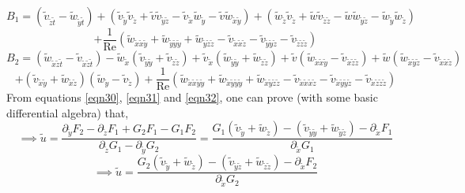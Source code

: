 \documentclass{article}
\begin{document}
\begin{equation*}
B_1 =  (\tilde{v}_{\tilde{z}\tilde{t}}-\tilde{w}_{\tilde{y}\tilde{t}})+(\tilde{v}_{\tilde{y}} \tilde{v}_{\tilde{z}} + \tilde{v} \tilde{v}_{\tilde{y}\tilde{z}} - \tilde{v}_{\tilde{x}} \tilde{w}_{\tilde{y}} - \tilde{v} \tilde{w}_{\tilde{x}\tilde{y}}) + (\tilde{w}_{\tilde{z}} \tilde{v}_{\tilde{z}} + \tilde{w} \tilde{v}_{\tilde{z}\tilde{z}} - \tilde{w} \tilde{w}_{\tilde{y}\tilde{z}} - \tilde{w}_{\tilde{y}} \tilde{w}_{\tilde{z}})
\end{equation*}
\begin{equation}
 + \frac{1}{\operatorname{Re}} (\tilde{w}_{\tilde{x}\tilde{x}\tilde{y}}+\tilde{w}_{\tilde{y}\tilde{y}\tilde{y}}+\tilde{w}_{\tilde{y}\tilde{z}\tilde{z}}-\tilde{v}_{\tilde{x}\tilde{x}\tilde{z}}-\tilde{v}_{\tilde{y}\tilde{y}\tilde{z}}-\tilde{v}_{\tilde{z}\tilde{z}\tilde{z}})
\end{equation}
\begin{equation*}
B_2 =  (\tilde{w}_{\tilde{x}\tilde{z}\tilde{t}}-\tilde{v}_{\tilde{x}\tilde{z}\tilde{t}}) - \tilde{w}_{\tilde{x}}(\tilde{v}_{\tilde{y}\tilde{y}}+\tilde{v}_{\tilde{z}\tilde{z}}) + \tilde{v}_{\tilde{x}}(\tilde{w}_{\tilde{y}\tilde{y}}+\tilde{w}_{\tilde{z}\tilde{z}}) + \tilde{v}(\tilde{w}_{\tilde{x}\tilde{x}\tilde{y}}-\tilde{v}_{\tilde{x}\tilde{z}\tilde{z}}) + \tilde{w}(\tilde{w}_{\tilde{x}\tilde{y}\tilde{z}}-\tilde{v}_{\tilde{x}\tilde{x}\tilde{z}}) 
\end{equation*}
\begin{equation}
+ (\tilde{v}_{\tilde{x}\tilde{y}}+\tilde{w}_{\tilde{x}\tilde{z}})(\tilde{w}_{\tilde{y}}-\tilde{v}_{\tilde{z}}) + \frac{1}{\operatorname{Re}} (\tilde{w}_{\tilde{x}\tilde{x}\tilde{y}\tilde{y}}+\tilde{w}_{\tilde{x}\tilde{y}\tilde{y}\tilde{y}}+\tilde{w}_{\tilde{x}\tilde{y}\tilde{z}\tilde{z}}-\tilde{v}_{\tilde{x}\tilde{x}\tilde{x}\tilde{z}}-\tilde{v}_{\tilde{x}\tilde{y}\tilde{y}\tilde{z}}-\tilde{v}_{\tilde{x}\tilde{z}\tilde{z}\tilde{z}})
\end{equation}
From equations \ref{eqn30}, \ref{eqn31} and \ref{eqn32}, one can prove (with some basic differential algebra) that,
\begin{equation*}
\implies \tilde{u} = \frac{\partial_{\tilde{y}}F_2-\partial_{\tilde{z}}F_1+G_2F_1-G_1F_2}{\partial_{\tilde{z}}G_1-\partial_{\tilde{y}}G_2} = \frac{G_1(\tilde{v}_{\tilde{y}}+\tilde{w}_{\tilde{z}})-(\tilde{v}_{\tilde{y}\tilde{y}}+\tilde{w}_{\tilde{y}\tilde{z}})-\partial_{\tilde{x}}F_1}{\partial_{\tilde{x}}G_1}
\end{equation*}
\begin{equation} \label{eqn12}
\implies \tilde{u} = \frac{G_2(\tilde{v}_{\tilde{y}}+\tilde{w}_{\tilde{z}})-(\tilde{v}_{\tilde{y}\tilde{z}}+\tilde{w}_{\tilde{z}\tilde{z}})-\partial_{\tilde{x}}F_2}{\partial_{\tilde{x}}G_2}
\end{equation}
\end{document}
